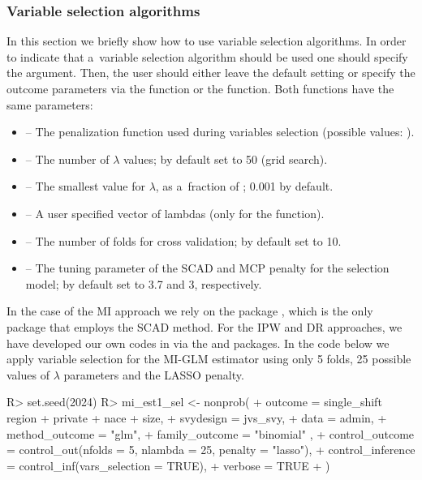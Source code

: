 \documentclass[nojss]{jss}
\begin{document}
\subsubsection{Variable selection
algorithms}\label{variable-selection-algorithms}

In this section we briefly show how to use variable selection
algorithms. In order to indicate that a~variable selection algorithm
should be used one should specify the
 argument.
Then, the user should either leave the default setting or specify the
outcome parameters via the  function or the
 function. Both functions have the same parameters:

\begin{itemize}
\item {} -- The penalization function used during variables selection (possible values: ).
\item {} -- The number of $\lambda$ values; by default set to 50 (grid search).
\item {} -- The smallest value for $\lambda$, as a~fraction of ; 0.001 by default.
\item {} -- A user specified vector of lambdas (only for the  function).
\item {} -- The number of folds for cross validation; by default set to 10.
\item {} -- The tuning parameter of the SCAD and MCP penalty for the selection model; by default set to 3.7 and 3, respectively.
\end{itemize}

In the case of the MI approach we rely on the  package
\citep{ncvreg}, which is the only  package that employs the
SCAD method. For the IPW and DR approaches, we have developed our own
codes in  via the  and 
packages. In the code below we apply variable selection for the MI-GLM
estimator using only 5 folds, 25 possible values of \(\lambda\)
parameters and the LASSO penalty.

\begin{CodeChunk}
\begin{CodeInput}
R> set.seed(2024)
R> mi_est1_sel <- nonprob(
+   outcome = single_shift ~ region + private + nace + size,
+   svydesign = jvs_svy,
+   data = admin,
+   method_outcome = "glm",
+   family_outcome = "binomial" ,
+   control_outcome = control_out(nfolds = 5, nlambda = 25, penalty = "lasso"),
+   control_inference = control_inf(vars_selection = TRUE),
+   verbose = TRUE
+ )
\end{CodeInput}
\end{CodeChunk}
\end{document}

